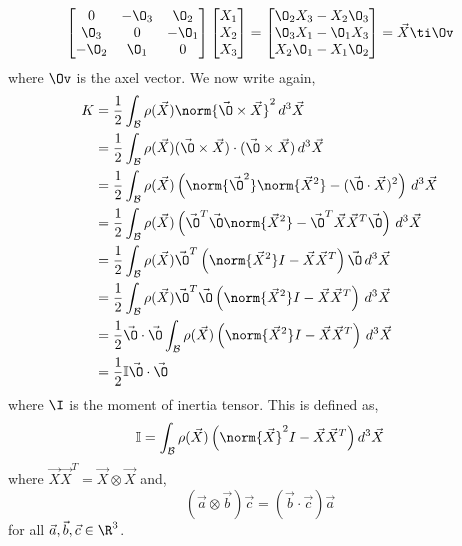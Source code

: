 \begin{align*}
  \begin{bmatrix}
    0 & -\O_3 & \O_2\\
    \O_3 & 0 & -\O_1\\
    -\O_2 & \O_1 & 0 \\
  \end{bmatrix}\begin{bmatrix}
    X_1\\ X_2\\ X_3
  \end{bmatrix} = \begin{bmatrix}
    \O_2X_3 - X_2\O_3\\ \O_3X_1 - \O_1X_3\\ X_2\O_1 - X_1\O_2
  \end{bmatrix} = \vec X \ti \Ov
\end{align*}
where $\Ov$ is the axel vector. We now write again,
\begin{align*}
  K &= \frac{1}{2} \int_\mathcal{B} {\rho (\vec X)\norm{\vec\O \times \vec X}^2 \,d^3\vec X}\\
  &= \frac{1}{2} \int_\mathcal{B} {\rho (\vec X)(\vec\O\times\vec X) \cdot (\vec\O\times\vec X) \,d^3\vec X}\\
  &= \frac{1}{2}\int_\mathcal{B} {\rho (\vec X)\left(\norm{\vec \O^2}\norm{\vec X^2} - (\vec\O \cdot \vec X)^2\right) \,d^3\vec X}\\
  &= \frac{1}{2}\int_\mathcal{B} {\rho (\vec X)\left(\vec\O^T\vec\O\norm{\vec X^2} - \vec\O^T\vec X \vec X^T\vec\O\right) \,d^3\vec X}\\
  &= \frac{1}{2}\int_\mathcal{B} {\rho (\vec X)\vec\O^T\left(\norm{\vec X^2}I - \vec X \vec X^T\right)\vec\O\, d^3\vec X}\\
  &= \frac{1}{2}\int_\mathcal{B} {\rho (\vec X)\vec\O^T\vec\O\left(\norm{\vec X^2}I - \vec X \vec X^T\right)\, d^3\vec X}\\
  &= \frac{1}{2}\vec\O \cdot \vec\O \int_\mathcal{B} {\rho (\vec X)\left(\norm{\vec X^2}I - \vec X \vec X^T\right)\, d^3\vec X}\\
  &= \frac{1}{2}\mathbb{I}\vec\O \cdot \vec \O
\end{align*}
where $\I$ is the moment of inertia tensor. This is defined as,
$$ \mathbb{I} = \int_\mathcal{B} \rho(\vec X)\left(\norm{\vec X}^2I - \vec X\vec X^T\right) d^3\vec X $$
where $\vec X\vec X^T = \vec X \otimes \vec X$ and,
$$ (\vec a \otimes \vec b)\vec c = (\vec b \cdot \vec c)\vec a $$
for all $\vec a, \vec b, \vec c \in \R^3$.
